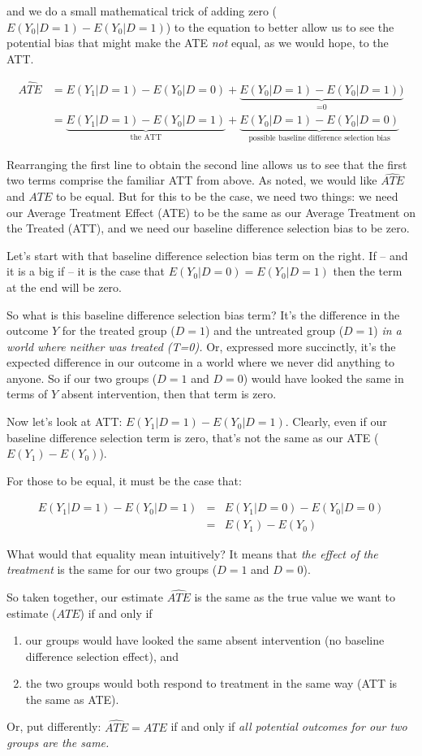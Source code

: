 \documentclass[11pt]{article}
\begin{document}
and we do a small mathematical trick of adding zero ($E(Y_{0}|D=1) - E(Y_{0}|D=1)$) to the equation to better allow us to see the potential bias that might make the ATE \emph{not} equal, as we would hope, to the ATT.

\begin{align*}
      \widehat{ATE }&=  E(Y_{1}|D=1) - E(Y_{0}|D=0) + \underbrace{E(Y_{0}|D=1) - E(Y_{0}|D=1))}_\text{=0} \\
        &= \underbrace{E(Y_{1}|D=1) - E(Y_{0}|D=1)}_\text{the ATT} + \underbrace{E(Y_{0}|D=1) - E(Y_{0}|D=0) }_\text{possible baseline difference selection bias}
\end{align*}

Rearranging the first line to obtain the second line allows us to see that the first two terms comprise the familiar ATT from above.  As noted, we would like $\widehat{ATE}$ and $ATE$ to be equal. But for this to be the case, we need two things: we need our Average Treatment Effect (ATE) to be the same as our Average Treatment on the Treated (ATT), and we need our baseline difference selection bias to be zero.


Let's start with that baseline difference selection bias term on the right. If -- and it is a big if -- it is the case that $E(Y_{0}|D=0) = E(Y_{0}|D=1)$ then the term at the end will be zero.

So what is this baseline difference selection bias term? It's the difference in the outcome $Y$ for the treated group ($D=1$) and the untreated group ($D=1$) \emph{in a world where neither was treated (T=0).} Or, expressed more succinctly, it's the expected difference in our outcome in a world where we never did anything to anyone. So if our two groups ($D=1$ and $D=0$) would have looked the same in terms of $Y$ absent intervention, then that term is zero.

Now let's look at ATT: $E(Y_{1}|D=1) - E(Y_{0}|D=1)$. Clearly, even if our baseline difference selection term is zero, that's not the same as our ATE ($E(Y_{1}) - E(Y_{0})$).

For those to be equal, it must be the case that:

\begin{eqnarray}
E(Y_{1}|D=1) - E(Y_{0}|D=1) &=& E(Y_{1}|D=0) - E(Y_{0}|D=0) \nonumber\\
 &=& E(Y_{1}) - E(Y_{0}) \nonumber
\end{eqnarray}

What would that equality mean intuitively? It means that \emph{the effect of the treatment} is the same for our two groups ($D=1$ and $D=0$).

So taken together, our estimate $\widehat{ATE}$ is the same as the true value we want to estimate ($ATE$) if and only if
\begin{enumerate}
  \item our groups would have looked the same absent intervention (no baseline difference selection effect), and
  \item the two groups would both respond to treatment in the same way (ATT is the same as ATE).
\end{enumerate}

Or, put differently: $\widehat{ATE} = ATE$ if and only if \emph{all potential outcomes for our two groups are the same.}
\end{document}
